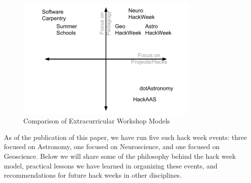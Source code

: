 \begin{figure}
\begin{center}
\includegraphics[width=9cm]{fig/HackSpectrum.png}
\caption{Comparison of Extracurricular Workshop Models}
\label{fig:hackspectrum}
\end{center}
\end{figure}

As of the publication of this paper, we have run five such hack week events: three focused on Astronomy, one focused on Neuroscience, and one focused on Geoscience.
Below we will share some of the philosophy behind the hack week model, practical lessons we have learned in organizing these events, and recommendations for future hack weeks in other disciplines.
